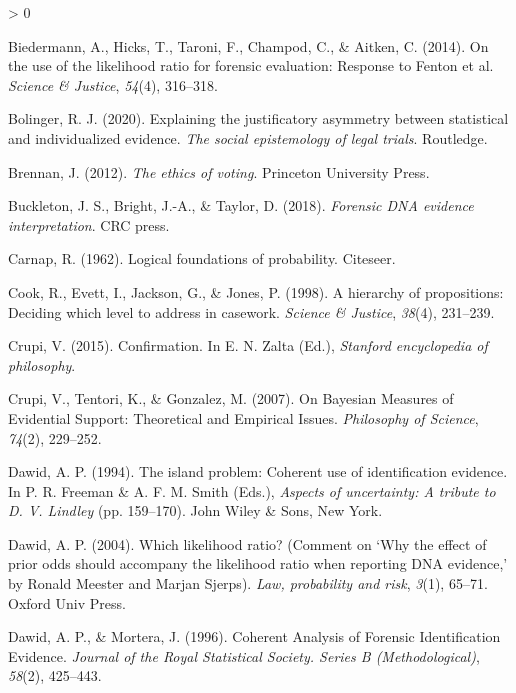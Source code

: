 \documentclass[
  10pt,
  dvipsnames,enabledeprecatedfontcommands]{scrartcl}
\newlength{\cslhangindent}
\newenvironment{CSLReferences}[2] %
 {%
  \setlength{\parindent}{0pt}
  \ifodd #1 \everypar{\setlength{\hangindent}{\cslhangindent}}\ignorespaces\fi
  \ifnum #2 > 0
  \setlength{\parskip}{#2\baselineskip}
  \fi
 }%
 {}
\begin{document}
\begin{CSLReferences}{1}{0}
\leavevmode\hypertarget{ref-biedermann2014UseLikelihoodRatio}{}%
Biedermann, A., Hicks, T., Taroni, F., Champod, C., \& Aitken, C.
(2014). On the use of the likelihood ratio for forensic evaluation:
{Response} to {Fenton} et al. \emph{Science \& Justice}, \emph{54}(4),
316--318.

\leavevmode\hypertarget{ref-bolinger2020individualized}{}%
Bolinger, R. J. (2020). Explaining the justificatory asymmetry between
statistical and individualized evidence. \emph{The social epistemology
of legal trials}. Routledge.

\leavevmode\hypertarget{ref-brennan2012ethics}{}%
Brennan, J. (2012). \emph{The ethics of voting}. Princeton University
Press.

\leavevmode\hypertarget{ref-buckleton2018forensic}{}%
Buckleton, J. S., Bright, J.-A., \& Taylor, D. (2018). \emph{Forensic
DNA evidence interpretation}. CRC press.

\leavevmode\hypertarget{ref-carnap1962logical}{}%
Carnap, R. (1962). Logical foundations of probability. Citeseer.

\leavevmode\hypertarget{ref-Cook1998hierarchy}{}%
Cook, R., Evett, I., Jackson, G., \& Jones, P. (1998). A hierarchy of
propositions: Deciding which level to address in casework. \emph{Science
\& Justice}, \emph{38}(4), 231--239.

\leavevmode\hypertarget{ref-crupi2015confirmation}{}%
Crupi, V. (2015). Confirmation. In E. N. Zalta (Ed.), \emph{Stanford
encyclopedia of philosophy}.

\leavevmode\hypertarget{ref-crupi2007BayesianMeasuresEvidential}{}%
Crupi, V., Tentori, K., \& Gonzalez, M. (2007). On {Bayesian Measures}
of {Evidential Support}: {Theoretical} and {Empirical Issues}.
\emph{Philosophy of Science}, \emph{74}(2), 229--252.

\leavevmode\hypertarget{ref-dawid1994island}{}%
Dawid, A. P. (1994). The island problem: Coherent use of identification
evidence. In P. R. Freeman \& A. F. M. Smith (Eds.), \emph{Aspects of
uncertainty: A tribute to {D. V. Lindley}} (pp. 159--170). John Wiley \&
Sons, New York.

\leavevmode\hypertarget{ref-dawid2004likelihood}{}%
Dawid, A. P. (2004). Which likelihood ratio? (Comment on {`{W}hy the
effect of prior odds should accompany the likelihood ratio when
reporting {DNA} evidence,'} by {R}onald {M}eester and {M}arjan
{S}jerps). \emph{Law, probability and risk}, \emph{3}(1), 65--71. Oxford
Univ Press.

\leavevmode\hypertarget{ref-dawid1996CoherentAnalysisForensic}{}%
Dawid, A. P., \& Mortera, J. (1996). Coherent {Analysis} of {Forensic
Identification Evidence}. \emph{Journal of the Royal Statistical
Society. Series B (Methodological)}, \emph{58}(2), 425--443.


\end{CSLReferences}
\end{document}
